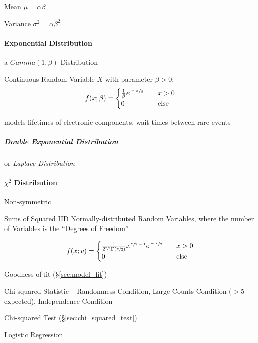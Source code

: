 Mean $\mu = \alpha \beta$

Variance $\sigma^2 = \alpha \beta^2$



\paragraph{Exponential Distribution}\label{sec:exponential_distribution}\hfill

a $Gamma(1,\beta)$ Distribution

Continuous Random Variable $X$ with parameter $\beta > 0$:
\[
  f(x; \beta) =
  \begin{cases}
  \frac{1}{\beta} e^{\sfrac{-x}{\beta}}     & \quad x > 0 \\
  0     & \quad\text{else} \\
  \end{cases}
\]

models lifetimes of electronic components, wait times between rare events



\subparagraph{Double Exponential Distribution}
\label{sec:double_exponential}\hfill

or \emph{Laplace Distribution}



\paragraph{$\chi^2$ Distribution}\label{sec:chi_squared}\hfill

Non-symmetric

Sums of Squared IID Normally-distributed Random Variables, where the number of
Variables is the ``Degrees of Freedom''

\[
  f(x; v) =
  \begin{cases}
    \frac{1}{2^{\sfrac{v}{2}}\Gamma(\sfrac{v}{2})}
      x^{\sfrac{v}{2-1}} e^{\sfrac{-x}{2}}
          & \quad x > 0 \\
    0     & \quad\text{else} \\
  \end{cases}
\]

Goodness-of-fit (\S\ref{sec:model_fit})

Chi-squared Statistic -- Randomness Condition, Large Counts Condition ($>5$
expected), Independence Condition

\fist Chi-squared Test (\S\ref{sec:chi_squared_test})

Logistic Regression



